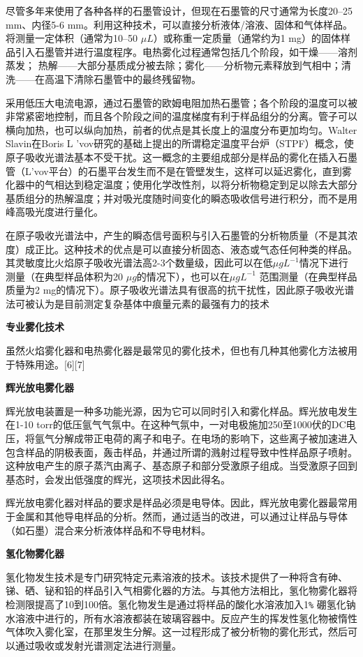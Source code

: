 尽管多年来使用了各种各样的石墨管设计，但现在石墨管的尺寸通常为长度20–25 mm、内径5-6 mm。利用这种技术，可以直接分析液体/溶液、固体和气体样品。将测量一定体积（通常为10–50 $\mu L$）或称重一定质量（通常约为1 mg）的固体样品引入石墨管并进行温度程序。电热雾化过程通常包括几个阶段，如干燥——溶剂蒸发； 热解——大部分基质成分被去除；雾化——分析物元素释放到气相中；清洗——在高温下清除石墨管中的最终残留物。

采用低压大电流电源，通过石墨管的欧姆电阻加热石墨管；各个阶段的温度可以被非常紧密地控制，而且各个阶段之间的温度梯度有利于样品组分的分离。管子可以横向加热，也可以纵向加热，前者的优点是其长度上的温度分布更加均匀。Walter Slavin在Boris L 'vov研究的基础上提出的所谓稳定温度平台炉（STPF）概念，使原子吸收光谱法基本不受干扰。这一概念的主要组成部分是样品的雾化在插入石墨管（L'vov平台）的石墨平台发生而不是在管壁发生，这样可以延迟雾化，直到雾化器中的气相达到稳定温度；使用化学改性剂，以将分析物稳定到足以除去大部分基质组分的热解温度；并对吸光度随时间变化的瞬态吸收信号进行积分，而不是用峰高吸光度进行量化。

在原子吸收光谱法中，产生的瞬态信号面积与引入石墨管的分析物质量（不是其浓度）成正比。这种技术的优点是可以直接分析固态、液态或气态任何种类的样品。其灵敏度比火焰原子吸收光谱法高2-3个数量级，因此可以在低$\mu g L^{-1}$情况下进行测量（在典型样品体积为20 $\mu g $的情况下），也可以在$\mu g L^{-1}$ 范围测量（在典型样品质量为2 mg的情况下）。原子吸收光谱法具有很高的抗干扰性，因此原子吸收光谱法可被认为是目前测定复杂基体中痕量元素的最强有力的技术

\textbf{专业雾化技术}

虽然火焰雾化器和电热雾化器是最常见的雾化技术，但也有几种其他雾化方法被用于特殊用途。[6][7]

\textbf{辉光放电雾化器}

辉光放电装置是一种多功能光源，因为它可以同时引入和雾化样品。辉光放电发生在1-10 torr的低压氩气气氛中。在这种气氛中，一对电极施加250至1000伏的DC电压，将氩气分解成带正电荷的离子和电子。在电场的影响下，这些离子被加速进入包含样品的阴极表面，轰击样品，并通过所谓的溅射过程导致中性样品原子喷射。这种放电产生的原子蒸汽由离子、基态原子和部分受激原子组成。当受激原子回到基态时，会发出低强度的辉光，这项技术因此得名。

辉光放电雾化器对样品的要求是样品必须是电导体。因此，辉光放电雾化器最常用于金属和其他导电样品的分析。然而，通过适当的改进，可以通过让样品与导体（如石墨）混合来分析液体样品和不导电材料。

\textbf{氢化物雾化器}

氢化物发生技术是专门研究特定元素溶液的技术。该技术提供了一种将含有砷、锑、硒、铋和铅的样品引入气相雾化器的方法。与其他方法相比，氢化物雾化器将检测限提高了10到100倍。氢化物发生是通过将样品的酸化水溶液加入1\verb|%| 硼氢化钠水溶液中进行的，所有水溶液都装在玻璃容器中。反应产生的挥发性氢化物被惰性气体吹入雾化室，在那里发生分解。这一过程形成了被分析物的雾化形式，然后可以通过吸收或发射光谱测定法进行测量。

